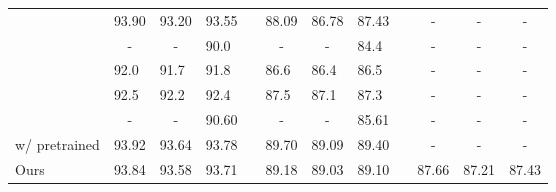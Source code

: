 \begin{table*}[tb]
\begin{tabularx}{\textwidth}{lccccccccccc}
        \cite{kitaev-klein-2018-constituency}           & 93.90                    & 93.20                    & 93.55                      &  & 88.09                    & 86.78                    & 87.43                    &  & -              & -              & -              \\
        \cite{gomez-rodriguez-vilares-2018-constituent} & -                        & -                        & 90.0\textcolor{white}{0}   &  & -                        & -                        & 84.4\textcolor{white}{0} &  & -              & -              & -              \\
        \cite{shen-etal-2018-straight}                  & 92.0\textcolor{white}{0} & 91.7\textcolor{white}{0} & 91.8\textcolor{white}{0}   &  & 86.6\textcolor{white}{0} & 86.4\textcolor{white}{0} & 86.5\textcolor{white}{0} &  & -              & -              & -              \\
        \cite{teng-zhang-2018-two} %
                                                        & 92.5\textcolor{white}{0} & 92.2\textcolor{white}{0} & 92.4\textcolor{white}{0}   &  & 87.5\textcolor{white}{0} & 87.1\textcolor{white}{0} & 87.3\textcolor{white}{0} &  & -              & -              & -              \\

        \cite{vilares-etal-2019-better}                 & -                        & -                        & 90.60                      &  & -                        & -                        & 85.61                    &  & -              & -              & -              \\
        \cite{zhou-zhao-2019-head} w/ pretrained        & 93.92                    & 93.64                    & 93.78                      &  & 89.70                    & 89.09                    & 89.40                    &  & -              & -              & -              \\[3pt]
        Ours                                            & 93.84                    & 93.58                    & 93.71                      &  & 89.18                    & 89.03                    & 89.10                    &  & 87.66          & 87.21          & 87.43          \\


\end{tabularx}
\end{table*}
